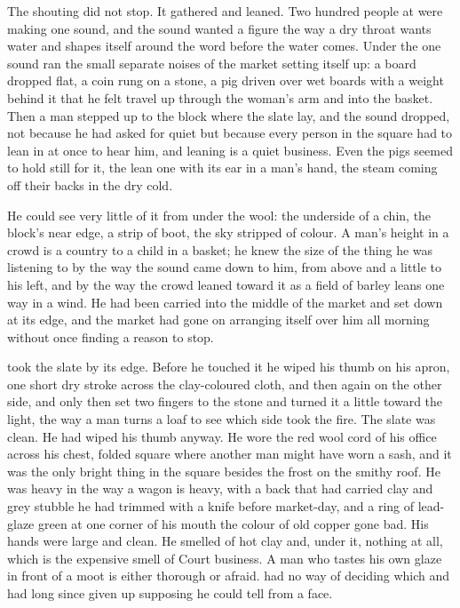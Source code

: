 The shouting did not stop. It gathered and leaned. Two hundred people at  were making one sound, and the sound wanted a figure the way a dry throat wants water and shapes itself around the word before the water comes. Under the one sound ran the small separate noises of the market setting itself up: a board dropped flat, a coin rung on a stone, a pig driven over wet boards with a weight behind it that he felt travel up through the woman's arm and into the basket. Then a man stepped up to the block where the slate lay, and the sound dropped, not because he had asked for quiet but because every person in the square had to lean in at once to hear him, and leaning is a quiet business. Even the pigs seemed to hold still for it, the lean one with its ear in a man's hand, the steam coming off their backs in the dry cold.

He could see very little of it from under the wool: the underside of a chin, the block's near edge, a strip of boot, the sky stripped of colour. A man's height in a crowd is a country to a child in a basket; he knew the size of the thing he was listening to by the way the sound came down to him, from above and a little to his left, and by the way the crowd leaned toward it as a field of barley leans one way in a wind. He had been carried into the middle of the market and set down at its edge, and the market had gone on arranging itself over him all morning without once finding a reason to stop.

 took the slate by its edge. Before he touched it he wiped his thumb on his apron, one short dry stroke across the clay-coloured cloth, and then again on the other side, and only then set two fingers to the stone and turned it a little toward the light, the way a man turns a loaf to see which side took the fire. The slate was clean. He had wiped his thumb anyway. He wore the red wool cord of his office across his chest, folded square where another man might have worn a sash, and it was the only bright thing in the square besides the frost on the smithy roof. He was heavy in the way a wagon is heavy, with a back that had carried clay and grey stubble he had trimmed with a knife before market-day, and a ring of lead-glaze green at one corner of his mouth the colour of old copper gone bad. His hands were large and clean. He smelled of hot clay and, under it, nothing at all, which is the expensive smell of Court business. A man who tastes his own glaze in front of a moot is either thorough or afraid.  had no way of deciding which and had long since given up supposing he could tell from a face.

